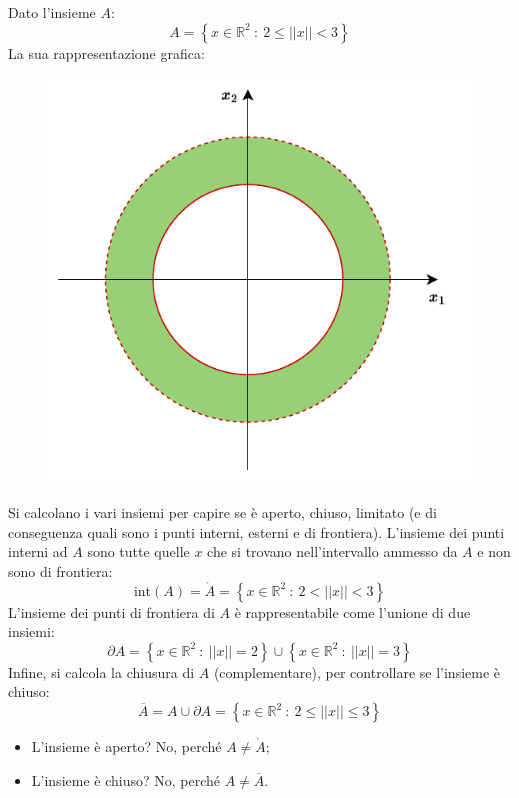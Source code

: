 \documentclass[a4paper]{article}
\begin{document}
	\noindent
	Dato l'insieme $A$:
	\begin{equation*}
		A = \left\{x \in \mathbb{R}^{2} \: : \: 2 \le ||x|| < 3 \right\}
	\end{equation*}
	La sua rappresentazione grafica:
	\begin{figure}[!htp]
		\centering
		\includegraphics[width=.7\textwidth]{img/insiemi_aperti-chiusi-1.pdf}
	\end{figure}

	\noindent
	Si calcolano i vari insiemi per capire se è aperto, chiuso, limitato (e di conseguenza quali sono i punti interni, esterni e di frontiera).\newline
	L'insieme dei punti interni ad $A$ sono tutte quelle $x$ che si trovano nell'intervallo ammesso da $A$ e non sono di frontiera:
	\begin{equation*}
		\mathrm{int}\left(A\right) = \mathring{A} = \left\{x \in \mathbb{R}^{2} \: : \: 2 < ||x|| < 3\right\}
	\end{equation*}
	L'insieme dei punti di frontiera di $A$ è rappresentabile come l'unione di due insiemi:
	\begin{equation*}
		\partial A = \left\{x \in \mathbb{R}^{2} \: : \: ||x|| = 2\right\} \cup \left\{x \in \mathbb{R}^{2} \: : \: ||x|| = 3\right\}
	\end{equation*}
	Infine, si calcola la chiusura di $A$ (complementare), per controllare se l'insieme è chiuso:
	\begin{equation*}
		\overline{A} = A \cup \partial A = \left\{x \in \mathbb{R}^{2} \: : \: 2 \le ||x|| \le 3 \right\}
	\end{equation*}
	\begin{itemize}
		\item L'insieme è aperto? No, perché $A \ne \mathring{A}$;
		\item L'insieme è chiuso? No, perché $A \ne \overline{A}$.
	\end{itemize}\newpage
\end{document}
